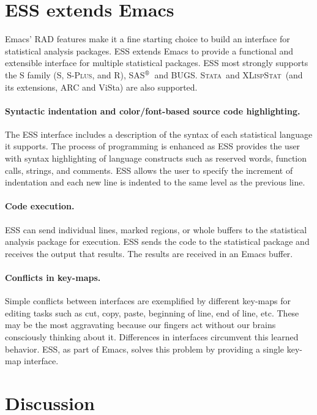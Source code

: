 \documentclass{article}
\newcommand{\SAS}{\textsc{SAS}$^{\mbox{\scriptsize\textregistered}}$}
\newcommand{\Splus}{\textsc{S-Plus}}
\newcommand*{\XLispStat}{\textsc{XLispStat}}
\newcommand*{\Stata}{\textsc{Stata}}
\begin{document}
\section{ESS extends Emacs}
\label{sec:ess-extends-emacs}

Emacs' RAD features make it a fine starting choice to
build an interface for statistical analysis packages.  ESS extends
Emacs to provide a functional and extensible interface
for multiple statistical packages. 
ESS most strongly supports the S family (S, \Splus, and R), \SAS\ and BUGS.  
\Stata\ and \XLispStat\ (and its extensions, ARC and ViSta) are
also supported.

\paragraph{Syntactic indentation and color/font-based source code
  highlighting.}  The ESS interface includes a description of the
syntax of each statistical language it supports.
The process of programming is enhanced as ESS provides the user with
syntax highlighting of language constructs such as reserved words,
function calls, strings, and comments.  ESS allows the user to specify
the increment of indentation and each new line is indented
to the same level as the previous line.

\paragraph{Code execution.}
ESS can send individual lines, marked regions, or whole buffers to the 
statistical analysis package for execution.  ESS sends the code to
the statistical package and receives the output that results.   The results
are received in an Emacs buffer. 

\paragraph{Conflicts in key-maps.}
\label{sec:confl-keym}

Simple conflicts between interfaces are exemplified by different
key-maps for editing tasks such as cut, copy, paste, beginning of
line, end of line, etc.  These may be the most aggravating
because our fingers act without our brains consciously
thinking about it.  Differences in interfaces
circumvent this learned behavior.  ESS, as part of Emacs, 
solves this problem by providing a single key-map interface.

\section{Discussion}
\label{sec:discussion}
\end{document}
